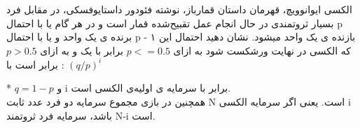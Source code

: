 الکسی ایوانوویچ، قهرمان داستان قمارباز، نوشته فئودور داستایوفسکی، در مقابل فرد بسیار ثروتمندی در حال انجام عمل تقبیح‌شده قمار است و در هر گام یا با احتمال p برنده ی یک واحد و یا با احتمال p - ۱ بازنده ی یک واحد میشود. نشان دهید احتمال این که الکسی در نهایت ورشکست شود به ازای  \(p <= 0.5\) برابر با یک و به ازای \( p > 0.5\) برابر است با :
\((q/p)^i \)

*  \(q = 1 - p\) و i برابر با سرمایه ی اولیه‌ی الکسی است.
\\
همچنین در بازی مجموع سرمایه دو فرد عدد ثابت 
N
است. یعنی اگر سرمایه الکسی 
i
باشد، سرمایه فرد ثروتمند
N-i
است.